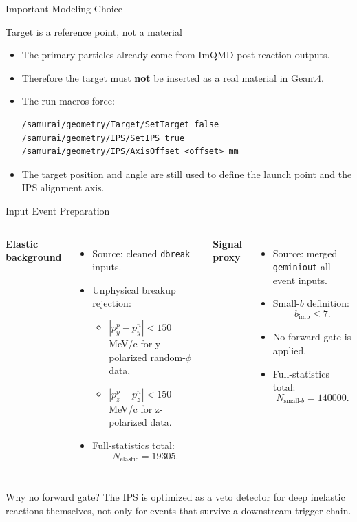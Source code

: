 \documentclass[aspectratio=169]{beamer}
\begin{document}
\begin{frame}[fragile]{Important Modeling Choice}
\begin{block}{Target is a reference point, not a material}
\begin{itemize}
  \item The primary particles already come from ImQMD post-reaction outputs.
  \item Therefore the target must \textbf{not} be inserted as a real material in Geant4.
  \item The run macros force:
\begin{lstlisting}
/samurai/geometry/Target/SetTarget false
/samurai/geometry/IPS/SetIPS true
/samurai/geometry/IPS/AxisOffset <offset> mm
\end{lstlisting}
  \item The target position and angle are still used to define the launch point and the IPS alignment axis.
\end{itemize}
\end{block}
\end{frame}

\begin{frame}{Input Event Preparation}
\begin{columns}[T]
\textbf{Elastic background}
\begin{itemize}
  \item Source: cleaned \texttt{dbreak} inputs.
  \item Unphysical breakup rejection:
  \begin{itemize}
    \item $|p_y^p - p_y^n| < 150$ MeV/c for y-polarized random-$\phi$ data,
    \item $|p_z^p - p_z^n| < 150$ MeV/c for z-polarized data.
  \end{itemize}
  \item Full-statistics total:
  \[
    N_{\mathrm{elastic}} = 19305.
  \]
\end{itemize}

\textbf{Signal proxy}
\begin{itemize}
  \item Source: merged \texttt{geminiout} all-event inputs.
  \item Small-$b$ definition:
  \[
    b_{\mathrm{imp}} \le 7.
  \]
  \item No forward gate is applied.
  \item Full-statistics total:
  \[
    N_{\mathrm{small}\text{-}b} = 140000.
  \]
\end{itemize}
\end{columns}
\vspace{0.3cm}
\begin{alertblock}{Why no forward gate?}
The IPS is optimized as a veto detector for deep inelastic reactions themselves, not only for events that survive a downstream trigger chain.
\end{alertblock}
\end{frame}
\end{document}
